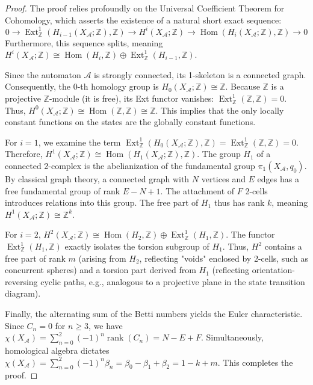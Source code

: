 \begin{proof}
The proof relies profoundly on the Universal Coefficient Theorem for Cohomology, which asserts the existence of a natural short exact sequence:
\[ 0 \to \operatorname{Ext}_\mathbb{Z}^1(H_{i-1}(X_\mathcal{A}; \mathbb{Z}), \mathbb{Z}) \to H^i(X_\mathcal{A}; \mathbb{Z}) \to \operatorname{Hom}(H_i(X_\mathcal{A}; \mathbb{Z}), \mathbb{Z}) \to 0 \]
Furthermore, this sequence splits, meaning $H^i(X_\mathcal{A}; \mathbb{Z}) \cong \operatorname{Hom}(H_i, \mathbb{Z}) \oplus \operatorname{Ext}_\mathbb{Z}^1(H_{i-1}, \mathbb{Z})$.

Since the automaton $\mathcal{A}$ is strongly connected, its 1-skeleton is a connected graph. Consequently, the 0-th homology group is $H_0(X_\mathcal{A}; \mathbb{Z}) \cong \mathbb{Z}$. Because $\mathbb{Z}$ is a projective $\mathbb{Z}$-module (it is free), its Ext functor vanishes: $\operatorname{Ext}_\mathbb{Z}^1(\mathbb{Z}, \mathbb{Z}) = 0$. Thus, $H^0(X_\mathcal{A}; \mathbb{Z}) \cong \operatorname{Hom}(\mathbb{Z}, \mathbb{Z}) \cong \mathbb{Z}$. This implies that the only locally constant functions on the states are the globally constant functions.

For $i=1$, we examine the term $\operatorname{Ext}_\mathbb{Z}^1(H_0(X_\mathcal{A}; \mathbb{Z}), \mathbb{Z}) = \operatorname{Ext}_\mathbb{Z}^1(\mathbb{Z}, \mathbb{Z}) = 0$. Therefore, $H^1(X_\mathcal{A}; \mathbb{Z}) \cong \operatorname{Hom}(H_1(X_\mathcal{A}; \mathbb{Z}), \mathbb{Z})$. The group $H_1$ of a connected 2-complex is the abelianization of the fundamental group $\pi_1(X_\mathcal{A}, q_0)$. By classical graph theory, a connected graph with $N$ vertices and $E$ edges has a free fundamental group of rank $E - N + 1$. The attachment of $F$ 2-cells introduces relations into this group. The free part of $H_1$ thus has rank $k$, meaning $H^1(X_\mathcal{A}; \mathbb{Z}) \cong \mathbb{Z}^k$.

For $i=2$, $H^2(X_\mathcal{A}; \mathbb{Z}) \cong \operatorname{Hom}(H_2, \mathbb{Z}) \oplus \operatorname{Ext}_\mathbb{Z}^1(H_1, \mathbb{Z})$. The functor $\operatorname{Ext}_\mathbb{Z}^1(H_1, \mathbb{Z})$ exactly isolates the torsion subgroup of $H_1$. Thus, $H^2$ contains a free part of rank $m$ (arising from $H_2$, reflecting "voids" enclosed by 2-cells, such as concurrent spheres) and a torsion part derived from $H_1$ (reflecting orientation-reversing cyclic paths, e.g., analogous to a projective plane in the state transition diagram).

Finally, the alternating sum of the Betti numbers yields the Euler characteristic. Since $C_n = 0$ for $n \ge 3$, we have $\chi(X_\mathcal{A}) = \sum_{n=0}^2 (-1)^n \operatorname{rank}(C_n) = N - E + F$. Simultaneously, homological algebra dictates $\chi(X_\mathcal{A}) = \sum_{n=0}^2 (-1)^n \beta_n = \beta_0 - \beta_1 + \beta_2 = 1 - k + m$. This completes the proof.
\end{proof}

